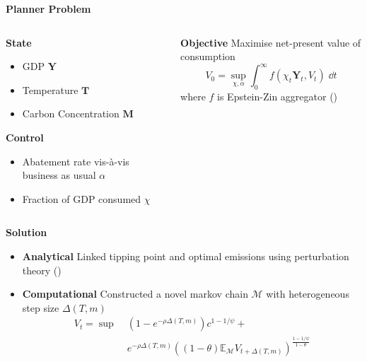 \documentclass[final]{beamer}
\newlength{\onecolwid}
\newlength{\twocolwid}
\newcommand{\T}{\mathbf{T}}
\newcommand{\M}{\mathbf{M}}
\newcommand{\Y}{\mathbf{Y}}
\begin{document}
\begin{frame}[t]
\begin{columns}[t]
\begin{column}{\twocolwid}
\textbf{\large Planner Problem} \vspace{1em}

\begin{columns}
    \begin{column}{\onecolwid}
        \textbf{State}
        
        \begin{itemize}
            \item GDP $\Y$
            \item Temperature $\T$
            \item Carbon Concentration $\M$
        \end{itemize}
        \textbf{Control}
        \begin{itemize}
            \item Abatement rate vis-à-vis business as usual $\alpha$
            \item Fraction of GDP consumed $\chi$
        \end{itemize}
    \end{column}
    \begin{column}{\onecolwid}
        \textbf{Objective}
        Maximise net-present value of consumption \begin{equation*}
            V_0 = \sup_{\chi, \alpha} \int^\infty_0 f(\chi_t \Y_t, V_t) \; \dd{t}
        \end{equation*} where $f$ is Epstein-Zin aggregator (\citeyear{epstein_substitution_1989})
    \end{column}
\end{columns}

\begin{columns}
    \begin{column}{\onecolwid}
        \textbf{\large Solution} \vspace{1em} 
        \begin{itemize}
            \item \textbf{Analytical} Linked tipping point and optimal emissions using perturbation theory (\cite{van_den_bremer_risk-adjusted_2021})
            \item \textbf{Computational} Constructed a novel markov chain $\mathcal{M}$ with heterogeneous step size $\Delta(T, m)$ \begin{equation*}
                \begin{split}
                    V_t = \sup \; &(1 - e^{-\rho \Delta(T, m)}) c^{{1 - 1 / \psi}} + \\ 
                    &e^{-\rho \Delta(T, m)} ((1 - \theta) \mathbb{E}_{\mathcal{M}} V_{t + \Delta(T, m)})^{\frac{1 - 1 / \psi}{1 - \theta}}
                \end{split}
            \end{equation*}
        \end{itemize}


\end{column}
\end{columns}
\end{column}
\end{columns}
\end{frame}
\end{document}
